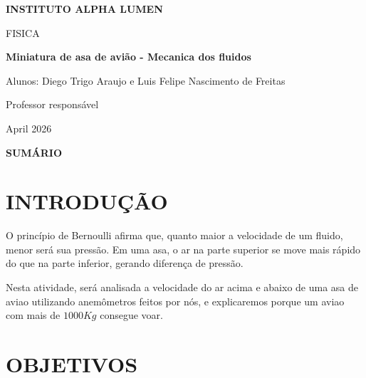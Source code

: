 \documentclass[12pt]{article}
\begin{document}
\begin{center}

\vspace*{4cm}

\textbf{INSTITUTO ALPHA LUMEN}\\

\vspace{1cm}

FISICA\\

\vspace{1cm}

\textbf{Miniatura de asa de avião - Mecanica dos fluidos}\\

\vspace{2cm}

Alunos: Diego Trigo Araujo e Luis Felipe Nascimento de Freitas\\

\vspace{0.5cm}

Professor responsável\\

\vfill

April 2026

\end{center}

\newpage

\begin{center}
\textbf{\large SUMÁRIO}
\end{center}

\vspace{0.5cm}

\tableofcontents

\newpage

\section{INTRODUÇÃO}

O princípio de Bernoulli afirma que, quanto maior a velocidade de um fluido, menor será sua pressão. Em uma asa, o ar na parte superior se move mais rápido do que na parte inferior, gerando diferença de pressão.

Nesta atividade, será analisada a velocidade do ar acima e abaixo de uma asa de aviao utilizando anemômetros feitos por nós, e explicaremos porque um aviao com mais de $1000Kg$ consegue voar.

\section{OBJETIVOS}
\end{document}
